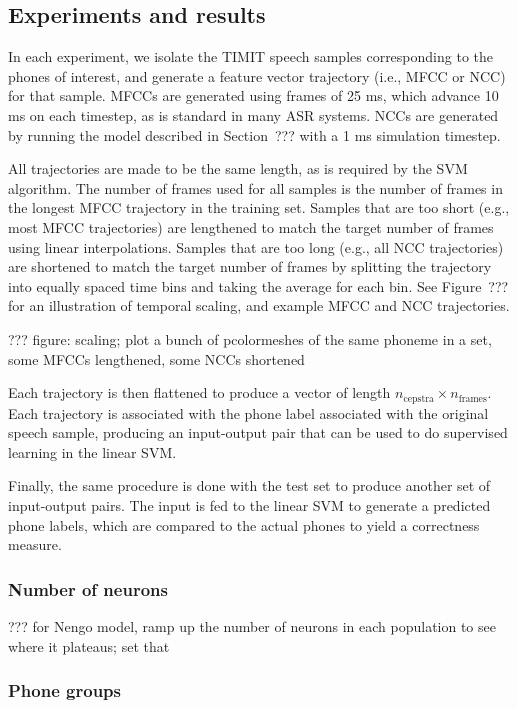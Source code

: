 \subsection{Experiments and results}

In each experiment,
we isolate the TIMIT speech samples
corresponding to the phones
of interest,
and generate a feature vector trajectory
(i.e., MFCC or NCC)
for that sample.
MFCCs are generated using frames
of 25 ms,
which advance 10 ms on each timestep,
as is standard in many ASR systems.
NCCs are generated
by running the model described in
Section~??? with a 1 ms simulation timestep.

All trajectories are
made to be the same length,
as is required by the SVM algorithm.
The number of frames used
for all samples is
the number of frames in
the longest MFCC trajectory
in the training set.
Samples that are too short
(e.g., most MFCC trajectories)
are lengthened to match the
target number of frames
using linear interpolations.
Samples that are too long
(e.g., all NCC trajectories)
are shortened to match the
target number of frames
by splitting the trajectory
into equally spaced time bins
and taking the average
for each bin.
See Figure~??? for
an illustration of temporal scaling,
and example MFCC and NCC trajectories.

??? figure: scaling; plot a bunch of
pcolormeshes of the same phoneme
in a set, some MFCCs lengthened,
some NCCs shortened

Each trajectory is then flattened
to produce a vector of length
$n_{\text{cepstra}} \times n_{\text{frames}}$.
Each trajectory is associated with
the phone label associated with
the original speech sample,
producing an input-output pair
that can be used to do supervised learning
in the linear SVM.

Finally, the same procedure is done
with the test set to produce another
set of input-output pairs.
The input is fed to the linear SVM
to generate a predicted phone labels,
which are compared to the actual phones
to yield a correctness measure.

\subsubsection{Number of neurons}

??? for Nengo model, ramp up the number of neurons
in each population to see where it plateaus;
set that

\subsubsection{Phone groups}

